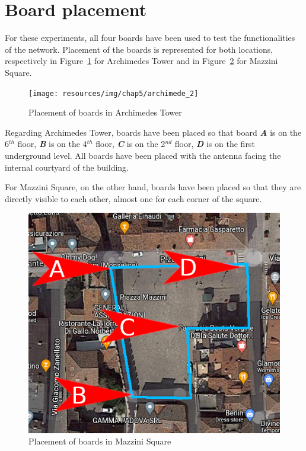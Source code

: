 	\section{Board placement}
	
		For these experiments, all four boards have been used to test the functionalities of the network.
		Placement of the boards is represented for both locations, respectively in Figure~\ref{img:archimede_2} for Archimedes Tower and in Figure~\ref{img:pzza_mazzini_2} for Mazzini Square.
		
		\begin{figure}[h]
			\centering
			\texttt{[image: resources/img/chap5/archimede\_2]}
			\caption{Placement of boards in Archimedes Tower}
			\label{img:archimede_2}
		\end{figure}
	
		Regarding Archimedes Tower, boards have been placed so that board \textbf{\textit{A}} is on the 6$^{th}$ floor, \textbf{\textit{B}} is on the 4$^{th}$ floor, \textbf{\textit{C}} is on the 2$^{nd}$ floor, \textbf{\textit{D}} is on the first underground level.
		All boards have been placed with the antenna facing the internal courtyard of the building.
		
		For Mazzini Square, on the other hand, boards have been placed so that they are directly visible to each other, almost one for each corner of the square.
		
		\begin{figure}[h]
			\centering
			\includegraphics[width=.75\textwidth]{resources/img/chap5/pzza_mazzini_3}
			\caption{Placement of boards in Mazzini Square}
			\label{img:pzza_mazzini_2}
		\end{figure}
	

